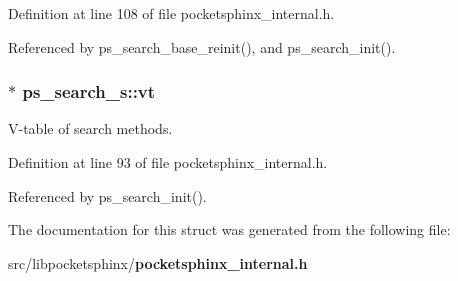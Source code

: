 Definition at line 108 of file pocketsphinx\+\_\+internal.\+h.



Referenced by ps\+\_\+search\+\_\+base\+\_\+reinit(), and ps\+\_\+search\+\_\+init().

\subsubsection[{vt}]{$\ast$ ps\+\_\+search\+\_\+s\+::vt}\label{structps__search__s_aa51e88956bbe9c05359d32526180809b}


V-\/table of search methods. 



Definition at line 93 of file pocketsphinx\+\_\+internal.\+h.



Referenced by ps\+\_\+search\+\_\+init().



The documentation for this struct was generated from the following file\+:\begin{DoxyCompactItemize}
\item 
src/libpocketsphinx/{\bf pocketsphinx\+\_\+internal.\+h}\end{DoxyCompactItemize}
